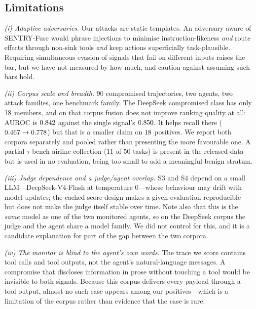 \documentclass[preprint,12pt,authoryear]{elsarticle}
\theoremstyle{definition}
\begin{document}
\subsection{Limitations}\label{sec:limitations}

\emph{(i) Adaptive adversaries.} Our attacks are static templates. An adversary
aware of SENTRY-Fuse would phrase injections to minimise instruction-likeness
\emph{and} route effects through non-sink tools \emph{and} keep actions
superficially task-plausible. Requiring simultaneous evasion of signals that fail
on different inputs raises the bar, but we have not measured by how much, and
\citet{nasr2025attackersecond} caution against assuming such bars hold.

\emph{(ii) Corpus scale and breadth.} $90$ compromised trajectories, two agents,
two attack families, one benchmark family. The DeepSeek compromised class has only
$18$ members, and on that corpus fusion does not improve ranking quality at
all: $\mathrm{AUROC}$ is $0.842$ against the single signal's
$0.850$. It helps recall there ($0.467 \to 0.778$) but that is
a smaller claim on $18$ positives. We report both corpora separately and
pooled rather than presenting the more favourable one. A partial
$\tau$-bench airline collection ($11$ of $50$ tasks) is present in the released
data but is used in no evaluation, being too small to add a meaningful benign
stratum.

\emph{(iii) Judge dependence and a judge/agent overlap.} S3 and S4 depend on a
small LLM---DeepSeek-V4-Flash at temperature $0$---whose behaviour may drift with
model updates; the cached-score design makes a given evaluation reproducible but
does not make the judge itself stable over time. Note also that this is the
\emph{same} model as one of the two monitored agents, so on the DeepSeek corpus
the judge and the agent share a model family. We did not control for this, and it
is a candidate explanation for part of the gap between the two corpora.

\emph{(iv) The monitor is blind to the agent's own words.} The trace we score
contains tool calls and tool outputs, not the agent's natural-language messages.
A compromise that discloses information in prose without touching a tool would be
invisible to both signals. Because this corpus delivers every payload through a
tool output, almost no such case appears among our positives---which is a
limitation of the corpus rather than evidence that the case is rare.
\end{document}
